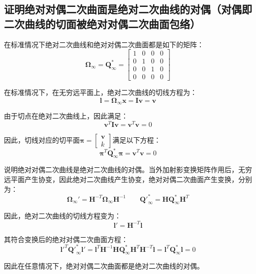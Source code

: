 \documentclass[11pt]{article}
\begin{document}
\subsection{证明绝对对偶二次曲面是绝对二次曲线的对偶（对偶即二次曲线的切面被绝对对偶二次曲面包络）}
在标准情况下绝对二次曲线和绝对对偶二次曲面都是如下的矩阵：
\begin{equation*}
  \mathbold{\Omega}_\infty=\mathbold{Q}^*_\infty=\begin{bmatrix}
    1 & 0 & 0 & 0 \\
    0 & 1 & 0 & 0 \\
    0 & 0 & 1 & 0 \\
    0 & 0 & 0 & 0
  \end{bmatrix}
\end{equation*}\par
在标准情况下，在无穷远平面上，绝对二次曲线的切线方程为：
\begin{equation*}
  \mathbold{l}=\mathbold{\Omega}_\infty\mathbold{x}=\mathbf{I}\mathbf{v}=\mathbf{v}
\end{equation*}\par
由于切点在绝对二次曲线上，因此满足：
\begin{equation*}
  \mathbold{v}^T\mathbold{Iv}=\mathbold{v}^T\mathbold{v}=0
\end{equation*}\par
因此，切线对应的切平面$\mathbold{\pi}=\begin{bmatrix}
  \mathbf{v} \\k
\end{bmatrix}$满足以下方程：
\begin{equation*}
  \mathbold{\pi}^T\mathbf{Q}_\infty^*\mathbold{\pi}=\mathbf{v}^T\mathbf{v}=0
\end{equation*}\par
说明绝对对偶二次曲线是绝对二次曲线的对偶。当外加射影变换矩阵作用后，无穷远平面产生协变，因此绝对二次曲线产生协变，绝对对偶二次曲面产生变换，分别为：
\begin{equation*}
  \mathbold{\Omega}_\infty'=\mathbold{H}^{-T}\mathbold{\Omega}_\infty\mathbold{H}^{-1}\qquad\mathbf{Q'}_\infty^{*}=\mathbold{H}\mathbold{Q}_\infty^*\mathbold{H}^T
\end{equation*}\par
因此，绝对二次曲线的切线方程变为：
\begin{equation*}
  \mathbold{l}'=\mathbf{H}^{-T}\mathbf{l}
\end{equation*}\par
其符合变换后的绝对对偶二次曲面方程：
\begin{equation*}
  \mathbf{l'}^T\mathbf{Q'}_\infty^{*}\mathbf{l'}=\mathbf{l}^T\mathbf{H}^{-1}\mathbf{H}\mathbf{Q}_\infty^*\mathbf{H}^T\mathbf{H}^{-T}\mathbf{l}=\mathbf{l}^T\mathbf{Q}_\infty^*\mathbf{l}=0
\end{equation*}\par
因此在任意情况下，绝对对偶二次曲面都是绝对二次曲线的对偶。
\end{document}
